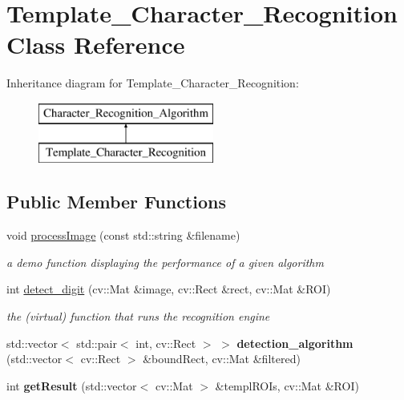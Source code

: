 \hypertarget{class_template___character___recognition}{}\section{Template\+\_\+\+Character\+\_\+\+Recognition Class Reference}
\label{class_template___character___recognition}
Inheritance diagram for Template\+\_\+\+Character\+\_\+\+Recognition\+:\begin{figure}[H]
\begin{center}
\leavevmode
\includegraphics[height=2.000000cm]{class_template___character___recognition}
\end{center}
\end{figure}
\subsection*{Public Member Functions}
\begin{DoxyCompactItemize}
\item 
\mbox{\label{class_template___character___recognition_a0391b26d50bbf8c821f874310b55251d}} 
void \mbox{\hyperlink{class_template___character___recognition_a0391b26d50bbf8c821f874310b55251d}{process\+Image}} (const std\+::string \&filename)
\begin{DoxyCompactList}\small\item\em a demo function displaying the performance of a given algorithm \end{DoxyCompactList}\item 
\mbox{\label{class_template___character___recognition_aa55d0eb825a758f696c96f9e309860f7}} 
int \mbox{\hyperlink{class_template___character___recognition_aa55d0eb825a758f696c96f9e309860f7}{detect\+\_\+digit}} (cv\+::\+Mat \&image, cv\+::\+Rect \&rect, cv\+::\+Mat \&R\+OI)
\begin{DoxyCompactList}\small\item\em the (virtual) function that runs the recognition engine \end{DoxyCompactList}\item 
\mbox{\label{class_template___character___recognition_af7efc98c7cf70968e8e9babd4435944e}} 
std\+::vector$<$ std\+::pair$<$ int, cv\+::\+Rect $>$ $>$ {\bfseries detection\+\_\+algorithm} (std\+::vector$<$ cv\+::\+Rect $>$ \&bound\+Rect, cv\+::\+Mat \&filtered)
\item 
\mbox{\label{class_template___character___recognition_a0af8778b93c92849d3413f2b3d0333bd}} 
int {\bfseries get\+Result} (std\+::vector$<$ cv\+::\+Mat $>$ \&templ\+R\+O\+Is, cv\+::\+Mat \&R\+OI)
\end{DoxyCompactItemize}
